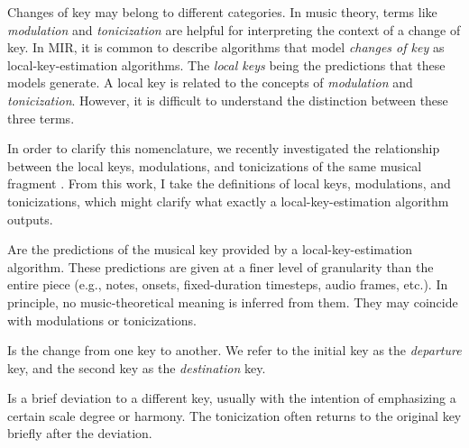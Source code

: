 

Changes of key may belong to different categories. In music
theory, terms like \emph{modulation} and \emph{tonicization}
are helpful for interpreting the context of a change of key.
In MIR, it is common to describe algorithms that model
\emph{changes of key} as local-key-estimation algorithms.
The \emph{local keys} being the predictions that these
models generate. A local key is related to the concepts of
\emph{modulation} and \emph{tonicization}. However, it is
difficult to understand the distinction between these three
terms.

In order to clarify this nomenclature, we recently
investigated the relationship between the local keys,
modulations, and tonicizations of the same musical fragment
\parencite{napoleslopez2020local}. From this work, I
take the definitions of local keys, modulations, and tonicizations, which might clarify what exactly a local-key-estimation algorithm outputs.

Are the predictions of the musical key provided by a
local-key-estimation algorithm. These predictions are given
at a finer level of granularity than the entire piece (e.g.,
notes, onsets, fixed-duration timesteps, audio frames,
etc.). In principle, no music-theoretical meaning is
inferred from them. They may coincide with modulations or
tonicizations.

Is the change from one key to another. We refer to the
initial key as the \emph{departure} key, and the second key
as the \emph{destination} key.

Is a brief deviation to a different key, usually with the
intention of emphasizing a certain scale degree or harmony.
The tonicization often returns to the original key briefly
after the deviation.
